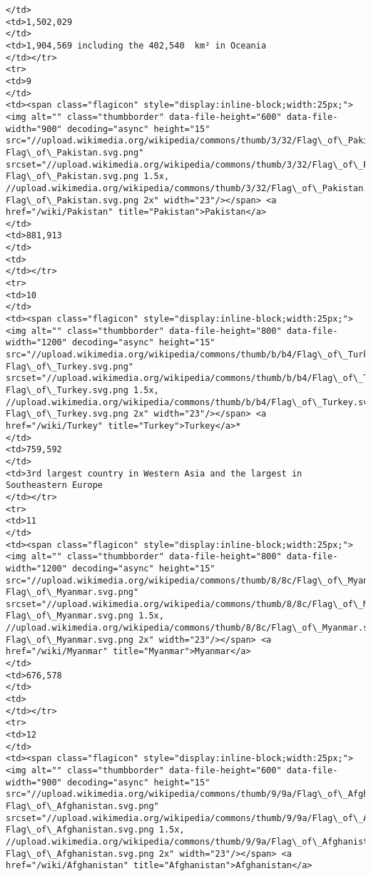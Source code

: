 \documentclass[11pt]{article}
\begin{document}
\begin{Verbatim}[commandchars=\\\{\}]
</td>
<td>1,502,029
</td>
<td>1,904,569 including the 402,540  km² in Oceania
</td></tr>
<tr>
<td>9
</td>
<td><span class="flagicon" style="display:inline-block;width:25px;"><img alt="" class="thumbborder" data-file-height="600" data-file-width="900" decoding="async" height="15" src="//upload.wikimedia.org/wikipedia/commons/thumb/3/32/Flag\_of\_Pakistan.svg/23px-Flag\_of\_Pakistan.svg.png" srcset="//upload.wikimedia.org/wikipedia/commons/thumb/3/32/Flag\_of\_Pakistan.svg/35px-Flag\_of\_Pakistan.svg.png 1.5x, //upload.wikimedia.org/wikipedia/commons/thumb/3/32/Flag\_of\_Pakistan.svg/45px-Flag\_of\_Pakistan.svg.png 2x" width="23"/></span> <a href="/wiki/Pakistan" title="Pakistan">Pakistan</a>
</td>
<td>881,913
</td>
<td>
</td></tr>
<tr>
<td>10
</td>
<td><span class="flagicon" style="display:inline-block;width:25px;"><img alt="" class="thumbborder" data-file-height="800" data-file-width="1200" decoding="async" height="15" src="//upload.wikimedia.org/wikipedia/commons/thumb/b/b4/Flag\_of\_Turkey.svg/23px-Flag\_of\_Turkey.svg.png" srcset="//upload.wikimedia.org/wikipedia/commons/thumb/b/b4/Flag\_of\_Turkey.svg/35px-Flag\_of\_Turkey.svg.png 1.5x, //upload.wikimedia.org/wikipedia/commons/thumb/b/b4/Flag\_of\_Turkey.svg/45px-Flag\_of\_Turkey.svg.png 2x" width="23"/></span> <a href="/wiki/Turkey" title="Turkey">Turkey</a>*
</td>
<td>759,592
</td>
<td>3rd largest country in Western Asia and the largest in Southeastern Europe
</td></tr>
<tr>
<td>11
</td>
<td><span class="flagicon" style="display:inline-block;width:25px;"><img alt="" class="thumbborder" data-file-height="800" data-file-width="1200" decoding="async" height="15" src="//upload.wikimedia.org/wikipedia/commons/thumb/8/8c/Flag\_of\_Myanmar.svg/23px-Flag\_of\_Myanmar.svg.png" srcset="//upload.wikimedia.org/wikipedia/commons/thumb/8/8c/Flag\_of\_Myanmar.svg/35px-Flag\_of\_Myanmar.svg.png 1.5x, //upload.wikimedia.org/wikipedia/commons/thumb/8/8c/Flag\_of\_Myanmar.svg/45px-Flag\_of\_Myanmar.svg.png 2x" width="23"/></span> <a href="/wiki/Myanmar" title="Myanmar">Myanmar</a>
</td>
<td>676,578
</td>
<td>
</td></tr>
<tr>
<td>12
</td>
<td><span class="flagicon" style="display:inline-block;width:25px;"><img alt="" class="thumbborder" data-file-height="600" data-file-width="900" decoding="async" height="15" src="//upload.wikimedia.org/wikipedia/commons/thumb/9/9a/Flag\_of\_Afghanistan.svg/23px-Flag\_of\_Afghanistan.svg.png" srcset="//upload.wikimedia.org/wikipedia/commons/thumb/9/9a/Flag\_of\_Afghanistan.svg/35px-Flag\_of\_Afghanistan.svg.png 1.5x, //upload.wikimedia.org/wikipedia/commons/thumb/9/9a/Flag\_of\_Afghanistan.svg/45px-Flag\_of\_Afghanistan.svg.png 2x" width="23"/></span> <a href="/wiki/Afghanistan" title="Afghanistan">Afghanistan</a>

\end{Verbatim}
\end{document}
